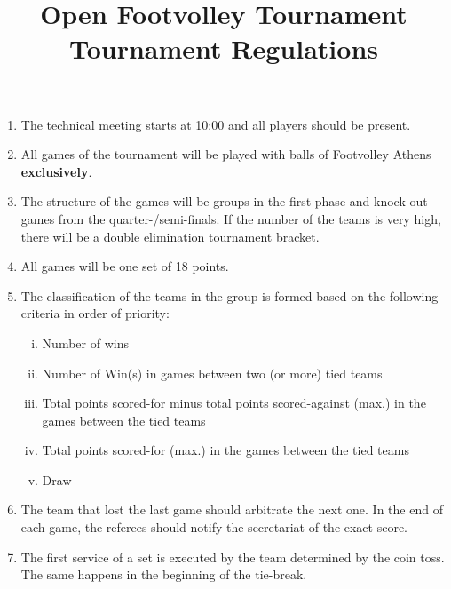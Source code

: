 \documentclass[a4paper,11pt]{article}
\title{Open Footvolley Tournament \\ Tournament Regulations}
\date{}
\begin{document}
\maketitle
\thispagestyle{fancy}

\vspace{-2cm}

\begin{enumerate}

\item The technical meeting starts at 10:00 and all players should be present.

\item All games of the tournament will be played with balls of Footvolley Athens
  \textbf{exclusively}.

\item The structure of the games will be groups in the first phase and knock-out
  games from the quarter-/semi-finals. If the number of the teams is very high,
  there will be a
  \href{https://www.printyourbrackets.com/9teamdoubleelimination.html}{double
    elimination tournament bracket}.

\item All games will be one set of 18 points.

\item The classification of the teams in the group is formed based on the
  following criteria in order of priority:

  \begin{enumerate}[i)]
  \item Number of wins
  \item Number of Win(s) in games between two (or more) tied teams
  \item Total points scored-for minus total points scored-against (max.) in the
    games between the tied teams
  \item Total points scored-for (max.) in the games between the tied teams
  \item Draw %
  \end{enumerate}

\item The team that lost the last game should arbitrate the next one. In the end
  of each game, the referees should notify the secretariat of the exact score.

\item The first service of a set is executed by the team determined by the coin
  toss. The same happens in the beginning of the tie-break.


\end{enumerate}
\end{document}
